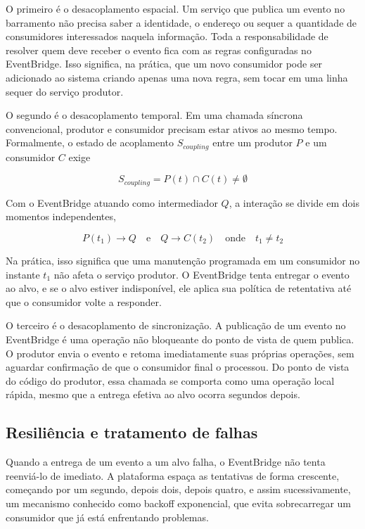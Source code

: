 \documentclass[12pt, a4paper]{article}
\begin{document}
O primeiro é o desacoplamento espacial. Um serviço que publica um evento no barramento não precisa saber a identidade, o endereço ou sequer a quantidade de consumidores interessados naquela informação. Toda a responsabilidade de resolver quem deve receber o evento fica com as regras configuradas no EventBridge. Isso significa, na prática, que um novo consumidor pode ser adicionado ao sistema criando apenas uma nova regra, sem tocar em uma linha sequer do serviço produtor.

O segundo é o desacoplamento temporal. Em uma chamada síncrona convencional, produtor e consumidor precisam estar ativos ao mesmo tempo. Formalmente, o estado de acoplamento $S_{coupling}$ entre um produtor $P$ e um consumidor $C$ exige

\begin{equation}
    S_{coupling} = P(t) \cap C(t) \neq \emptyset
\end{equation}

Com o EventBridge atuando como intermediador $Q$, a interação se divide em dois momentos independentes,

\begin{equation}
    P(t_1) \rightarrow Q \quad \text{e} \quad Q \rightarrow C(t_2) \quad \text{onde} \quad t_1 \neq t_2
\end{equation}

Na prática, isso significa que uma manutenção programada em um consumidor no instante $t_1$ não afeta o serviço produtor. O EventBridge tenta entregar o evento ao alvo, e se o alvo estiver indisponível, ele aplica sua política de retentativa até que o consumidor volte a responder.

O terceiro é o desacoplamento de sincronização. A publicação de um evento no EventBridge é uma operação não bloqueante do ponto de vista de quem publica. O produtor envia o evento e retoma imediatamente suas próprias operações, sem aguardar confirmação de que o consumidor final o processou. Do ponto de vista do código do produtor, essa chamada se comporta como uma operação local rápida, mesmo que a entrega efetiva ao alvo ocorra segundos depois.

\subsection{Resiliência e tratamento de falhas}

Quando a entrega de um evento a um alvo falha, o EventBridge não tenta reenviá-lo de imediato. A plataforma espaça as tentativas de forma crescente, começando por um segundo, depois dois, depois quatro, e assim sucessivamente, um mecanismo conhecido como backoff exponencial, que evita sobrecarregar um consumidor que já está enfrentando problemas.
\end{document}
